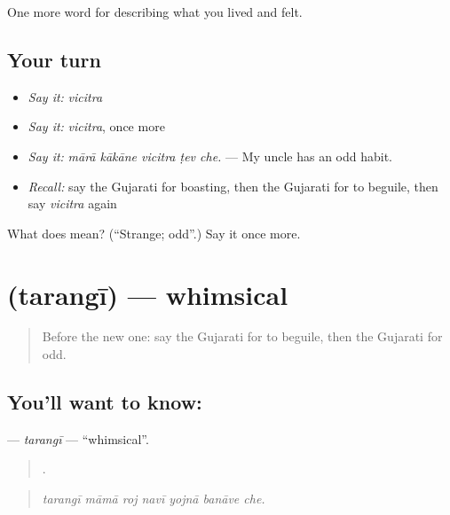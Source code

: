\begin{grammarlens}[title={What you've built}]
One more word for describing what you lived and felt.
\end{grammarlens}

\subsection*{Your turn}
\begin{itemize}
\raggedright
  \item \emph{Say it:} \emph{vicitra}
  \item \emph{Say it:} \emph{vicitra}, once more
  \item \emph{Say it:} \emph{mārā kākāne vicitra ṭev che.} — My uncle has an odd habit.
  \item \emph{Recall:} say the Gujarati for boasting, then the Gujarati for to beguile, then say \emph{vicitra} again
\end{itemize}

\begin{tcolorbox}[breakable,colback=teal!4,colframe=teal!35!black,title={Before you move on}]
What does  mean? (\textquotedblleft{}Strange; odd\textquotedblright{}.) Say it once more.
\end{tcolorbox}
\section[\texorpdfstring{\gu{તરંગી} (tarangī)}{તરંગી (tarangī)}]{ (tarangī) — whimsical}

\label{lesson:GU-C469-tarangi}



\begin{quote}
Before the new one: say the Gujarati for to beguile, then the Gujarati for odd.
\end{quote}

\subsection*{You'll want to know: }
\textbf{} — \emph{tarangī} — \textquotedblleft{}whimsical\textquotedblright{}.

\begin{quote}
      .
\end{quote}

\begin{quote}
\emph{tarangī māmā roj navī yojnā banāve che.}
\end{quote}

